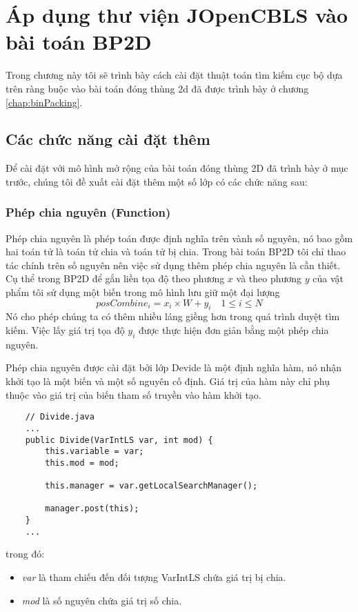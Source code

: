 \chapter{Áp dụng thư viện JOpenCBLS vào bài toán BP2D}
\label{chap:implement}
Trong chương này tôi sẽ trình bày cách cài đặt thuật toán tìm kiếm cục bộ dựa trên ràng buộc vào bài toán đóng thùng 2d đã được trình bày ở chương \ref{chap:binPacking}.

\section{Các chức năng cài đặt thêm}
Để cài đặt với mô hình mở rộng của bài toán đóng thùng 2D đã trình bày ở mục trước, chúng tôi đề xuất cài đặt thêm một số lớp có các chức năng sau:
\subsection{Phép chia nguyên (Function)}
Phép chia nguyên là phép toán được định nghĩa trên vành số nguyên, nó bao gồm hai toán tử là toán tử chia và toán tử bị chia. Trong bài toán BP2D tôi chỉ thao tác chính trên số nguyên nên việc sử dụng thêm phép chia nguyên là cần thiết. Cụ thể trong BP2D để gắn liền tọa độ theo phương $x$ và theo phương $y$ của vật phẩm tôi sử dụng một biến trong mô hình lưu giữ một đại lượng 
\[ posCombine_i = x_i \times W + y_i \quad 1 \leq i \leq N \]
Nó cho phép chúng ta có thêm nhiều láng giềng hơn trong quá trình duyệt tìm kiếm. Việc lấy giá trị tọa độ $y_i$ được thực hiện đơn giản bằng một phép chia nguyên.

Phép chia nguyên được cài đặt bởi lớp \textsf{Devide} là một định nghĩa hàm, nó nhận khởi tạo là một biến và một số nguyên cố định. Giá trị của hàm này chỉ phụ thuộc vào giá trị của biến tham số truyền vào hàm khởi tạo.
\begin{lstlisting}
	// Divide.java
	...
	public Divide(VarIntLS var, int mod) {
		this.variable = var;
		this.mod = mod;
		
		this.manager = var.getLocalSearchManager();
		
		manager.post(this);
	}
	...
\end{lstlisting}
trong đó:
\begin{itemize}
	\item \textit{var} là tham chiếu đến đối tượng \textsf{VarIntLS} chứa giá trị bị chia.
	\item \textit{mod} là số nguyên chứa giá trị số chia.
\end{itemize}
